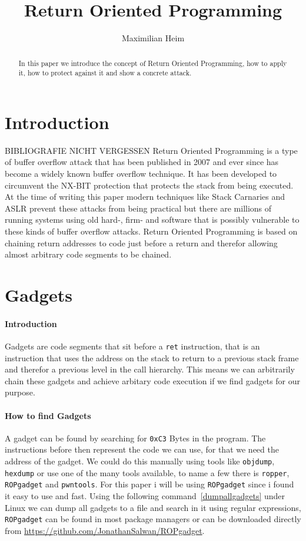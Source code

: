 \documentclass[journal=tosc,submission]{iacrtrans}
\author{Maximilian Heim}
\institute{
  University Albstadt-Sigmaringen, Albstadt, Germany, \email{MaximilianHeim@protonmail.com}
}
\title{Return Oriented Programming}
\begin{document}
\maketitle




\begin{abstract}
  In this paper we introduce the concept of Return Oriented Programming, how to apply it, how to protect against it and show a concrete attack.
\end{abstract}


\section{Introduction}
BIBLIOGRAFIE NICHT VERGESSEN
Return Oriented Programming is a type of buffer overflow attack that has been published in 2007 and ever since has become a widely known buffer overflow technique. It has been developed to circumvent the NX-BIT protection that protects the stack from being executed. At the time of writing this paper modern techniques like Stack Carnaries and ASLR prevent these attacks from being practical but there are millions of running systems using old hard-, firm- and software that is possibly vulnerable to these kinds of buffer overflow attacks. Return Oriented Programming is based on chaining return addresses to code just before a return and therefor allowing almost arbitrary code segments to be chained.


\section{Gadgets}
\label{sec:main}
\paragraph{Introduction}
Gadgets are code segments that sit before a \Verb+ret+ instruction, that is an instruction that uses the address on the stack to return to a previous stack frame and therefor a previous level in the call hierarchy. This means we can arbitrarily chain these gadgets and achieve arbitary code execution if we find gadgets for our purpose.

\paragraph{How to find Gadgets}
A gadget can be found by searching for \Verb+0xC3+ Bytes in the program. The instructions before then represent the code we can use, for that we need the address of the gadget. We could do this manually using tools like \Verb+objdump+, \Verb+hexdump+ or use one of the many tools available, to name a few there is \Verb+ropper+, \Verb+ROPgadget+ and \Verb+pwntools+. For this paper i will be using \Verb+ROPgadget+ since i found it easy to use and fast. Using the following command~\cref{dumpallgadgets} under Linux we can dump all gadgets to a file and search in it using regular expressions, \Verb+ROPgadget+ can be found in most package managers or can be downloaded directly from \url{https://github.com/JonathanSalwan/ROPgadget}.
\end{document}

